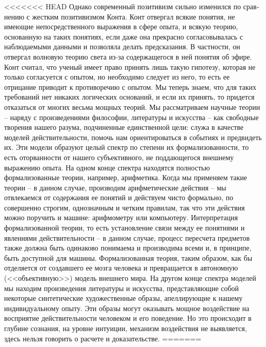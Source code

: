 \documentclass{book}
\begin{document}
<<<<<<< HEAD
Однако современный позитивизм сильно изменился по срав­нению с жестким позитивизмом Конта. Конт отвергал всякие понятия, не имеющие непосредственного выражения в сфере опыта, и всякую теорию, основанную на таких понятиях, если даже она прекрасно согласовывалась с наблюдаемыми данными и позволяла делать предсказания. В частности, он отвергал волновую теорию света из‑за содержащегося в ней понятия об эфире. Конт считал, что ученый имеет право принять лишь такую гипотезу, которая не только согласуется с опытом, но необходимо следует из него, то есть ее отрицание приводит к противоречию с опытом. Мы теперь знаем, что для таких требований нет никаких логических оснований, и если их принять, то придется отказаться от многих весьма мощных теорий. Мы рассматриваем научные теории -- наряду с произведениями философии, литературы и искусства -- как свободные творения нашего ра­зума, подчиненные единственной цели: служа в качестве моделей действительности, помочь нам ориентироваться в событиях и предвидеть их. Эти модели образуют целый спектр по степени их формализованности,  то есть оторванности от нашего субъек­тивного, не поддающегося внешнему выражению опыта. На од­ном конце спектра находятся полностью формализованные теории, например, арифметика. Когда мы применяем такие теории -- в данном случае, производим арифметические действия -- мы отвлекаемся от содержания ее понятий и действуем чисто формально, по совершенно строгим, однозначным и четким правилам, так что эти действия можно поручить и машине: арифмометру или компьютеру. Интерпретация формализованной теории, то есть установление связи между ее понятиями и явлениями действительности -- в данном случае, процесс пересчета предметов ~ также должна быть одинаково понимаема и производима всеми и, в принципе, быть доступной для машины. Формализованная теория, таким образом, как бы отделяется от создавшего ее мозга человека и превращается в автономную (<<объективную>>) модель внешнего мира. На другом конце спектра моделей мы находим произведения литературы и ис­кусства, представляющие собой некоторые синтетические художественные образы, апеллирующие к нашему индивидуальному опыту. Эти образы могут оказывать мощное воздействие на восприятие действительности человеком и его поведение. Но это происходит в глубине сознания, на уровне интуиции, механизм воздействия не выявляется, здесь нельзя говорить о расчете и доказательстве.
=======
\end{document}
